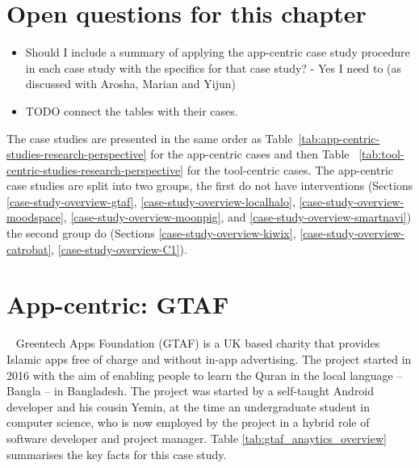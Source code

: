 \section*{Open questions for this chapter}
{\small
\begin{itemize}
    \itemsep0em
    \item Should I include a summary of applying the app-centric case study procedure in each case study with the specifics for that case study? - Yes I need to (as discussed with Arosha, Marian and Yijun)
    \item TODO connect the tables with their cases.
\end{itemize}
}  %

The case studies are presented in the same order as Table~\ref{tab:app-centric-studies-research-perspective} for the app-centric cases and then Table ~\ref{tab:tool-centric-studies-research-perspective} for the tool-centric cases. The app-centric case studies are split into two groups, the first do not have interventions (Sections \ref{case-study-overview-gtaf}, \ref{case-study-overview-localhalo}, \ref{case-study-overview-moodspace}, \ref{case-study-overview-moonpig}, and \ref{case-study-overview-smartnavi}) the second group do (Sections \ref{case-study-overview-kiwix}, \ref{case-study-overview-catrobat}, \ref{case-study-overview-C1}).

\clearpage





\section{App-centric: GTAF}~\label{case-study-overview-gtaf}
Greentech Apps Foundation (GTAF) is a UK based charity that provides Islamic apps free of charge and without in-app advertising. The project started in 2016 with the aim of enabling people to learn the Quran in the local language -- Bangla -- in Bangladesh. The project was started by a self-taught Android developer and his cousin Yemin, at the time an undergraduate student in computer science, who is now employed by the project in a hybrid role of software developer and project manager. Table \ref{tab:gtaf_anaytics_overview} summarises the key facts for this case study.

